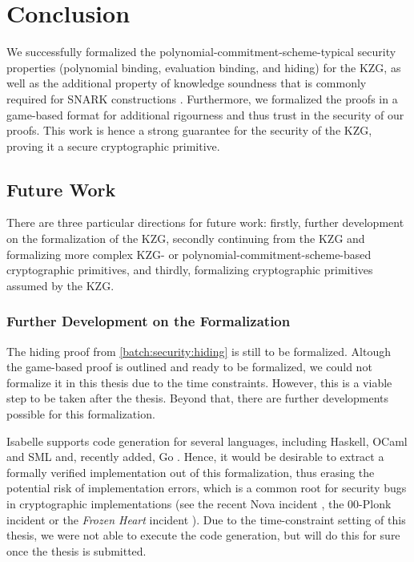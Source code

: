 \chapter{Conclusion}\label{chapter:conclusion}
We successfully formalized the polynomial-commitment-scheme-typical security properties (polynomial binding, evaluation binding, and hiding) for the KZG, as well as the additional property of knowledge soundness that is commonly required for SNARK constructions \parencite{thalerbook,plonk,sonic,halo}. Furthermore, we formalized the proofs in a game-based format for additional rigourness and thus trust in the security of our proofs.
This work is hence a strong guarantee for the security of the KZG, proving it a secure cryptographic primitive.

\section*{Future Work}
There are three particular directions for future work: firstly, further development on the formalization of the KZG, secondly continuing from the KZG and formalizing more complex KZG- or polynomial-commitment-scheme-based cryptographic primitives, and thirdly, formalizing cryptographic primitives assumed by the KZG.

\subsection*{Further Development on the Formalization}
The hiding proof from \ref*{batch:security:hiding} is still to be formalized. Altough the game-based proof is outlined and ready to be formalized, we could not formalize it in this thesis due to the time constraints. However, this is a viable step to be taken after the thesis. Beyond that, there are further developments possible for this formalization. 

Isabelle supports code generation for several languages, including Haskell, OCaml and SML \parencite{code_gen} and, recently added, Go \parencite{go_codegen}. Hence, it would be desirable to extract a formally verified implementation out of this formalization, thus erasing the potential risk of implementation errors, which is a common root for security bugs in cryptographic implementations (see the recent Nova incident \parencite{nova_bug}, the 00-Plonk incident \parencite{00Plonk} or the \textit{Frozen Heart} incident \parencite{FHPlonk}). Due to the time-constraint setting of this thesis, we were not able to execute the code generation, but will do this for sure once the thesis is submitted.


